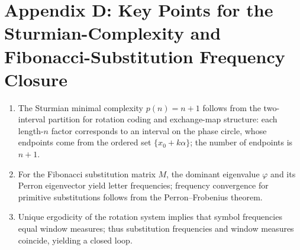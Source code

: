﻿\section{Appendix D: Key Points for the Sturmian-Complexity and Fibonacci-Substitution Frequency Closure}
\label{app:sturmian-pf}

\begin{enumerate}
  \item The Sturmian minimal complexity $p(n)=n+1$ follows from the two-interval partition for rotation coding and exchange-map structure: each length-$n$ factor corresponds to an interval on the phase circle, whose endpoints come from the ordered set $\{x_0+k\alpha\}$; the number of endpoints is $n+1$.
  \item For the Fibonacci substitution matrix $M$, the dominant eigenvalue $\varphi$ and its Perron eigenvector yield letter frequencies; frequency convergence for primitive substitutions follows from the Perron--Frobenius theorem.
  \item Unique ergodicity of the rotation system implies that symbol frequencies equal window measures; thus substitution frequencies and window measures coincide, yielding a closed loop.
\end{enumerate}
